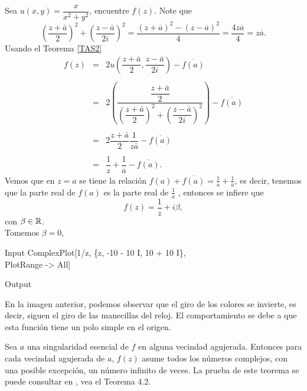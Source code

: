 \begin{Ejem}
	Sea $u(x,y)=\dfrac{x}{x^2+y^2}$, encuentre $f(z)$.
	\solu Note que 
	$$\left(\dfrac{z+\bar{a}}{2}\right)^{2}+\left(\dfrac{z-\bar{a}}{2i}\right)^2=\dfrac{(z+\overline{a})^2-(z-\overline{a})^2}{4}=\dfrac{4z\overline{a}}{4}=z\overline{a}.$$
	Usando el Teorema \ref{TAS2}
	\[
		\begin{array}{ccl}
			f(z)&=&2u\left(\dfrac{z+\bar{a}}{2},\dfrac{z-\bar{a}}{2i}\right)-\overline{f(a)}\\\\
			&=&2\left(\dfrac{\dfrac{z+\bar{a}}{2}}{\left(\dfrac{z+\bar{a}}{2}\right)^{2}+\left(\dfrac{z-\bar{a}}{2i}\right)^2}\right)-\overline{f(a)}\\\\
			&=&2\dfrac{z+\bar{a}}{2}\dfrac{1}{z\bar{a}}-\overline{f(a)}\\\\
			&=&\dfrac{1}{z}+\dfrac{1}{\overline{a}}-\overline{f(a)}.
		\end{array}
	\]
	Vemos que en $z = a$ se tiene la relación $f(a)+\overline{f(a)}=\frac{1}{a}+\frac{1}{\overline{a}}$, es decir, tenemos  que la parte real de $f(a)$ es la parte real de $\frac{1}{\overline{a}}$ , entonces se infiere que
	$$f(z)=\dfrac{1}{z}+i\beta,$$
	con $\beta\in\mathbb{R}$.\\Tomemos $\beta=0$,
	\begin{mmaCell}{Input}
		ComplexPlot[1/z, \{z, -10 - 10 I, 10 + 10 I\},\\PlotRange -> All]
	\end{mmaCell}
	
	\begin{mmaCell}[moregraphics={moreig={scale=.50}}]{Output}
	\end{mmaCell}
En la imagen anterior, podemos observar que el giro de los colores se invierte, es decir, siguen el giro de las manecillas del reloj. El comportamiento se debe a que esta función tiene un polo simple en el origen. \endproof
\end{Ejem}
\begin{teor}\label{GTP}
	Sea $a$ una singularidad esencial de $f$ en alguna vecindad agujerada. Entonces para cada vecindad agujerada de $a$, $f(z)$ asume todos los números complejos, con una posible excepción, un número infinito de veces.
	La prueba de este teorema se puede consultar en \cite{Conway}, vea el Teorema 4.2.
\end{teor}
